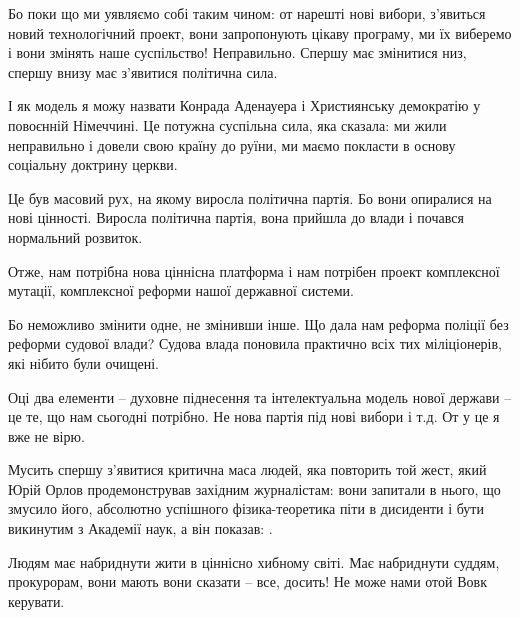 Бо поки що ми уявляємо собі таким чином: от нарешті нові вибори, з’явиться
новий технологічний проект, вони запропонують цікаву програму, ми їх виберемо і
вони змінять наше суспільство! Неправильно. Спершу має змінитися низ, спершу
внизу має з’явитися політична сила. 

І як модель я можу назвати Конрада Аденауера і Християнську демократію у
повоєнній Німеччині. Це потужна суспільна сила, яка сказала: ми жили
неправильно і довели свою країну до руїни, ми маємо покласти в основу соціальну
доктрину церкви. 

Це був масовий рух, на якому виросла політична партія. Бо вони опиралися на
нові цінності. Виросла політична партія, вона прийшла до влади і почався
нормальний розвиток. 

Отже, нам потрібна нова ціннісна платформа і нам потрібен проект комплексної
мутації, комплексної реформи нашої державної системи. 

Бо неможливо змінити одне, не змінивши інше. Що дала нам реформа поліції без
реформи судової влади? Судова влада поновила практично всіх тих міліціонерів,
які нібито були очищені. 

Оці два елементи – духовне піднесення та інтелектуальна модель нової держави –
це те, що нам сьогодні потрібно. Не нова партія під нові вибори і т.д. От у це
я вже не вірю. 

Мусить спершу з’явитися критична маса людей, яка повторить той жест, який Юрій
Орлов продемонстрував західним журналістам: вони запитали в нього, що змусило
його, абсолютно успішного фізика-теоретика піти в дисиденти і бути викинутим з
Академії наук, а він показав: . 

Людям має набриднути жити в ціннісно хибному світі. Має набриднути суддям,
прокурорам, вони мають вони сказати – все, досить! Не може нами отой Вовк
керувати.
